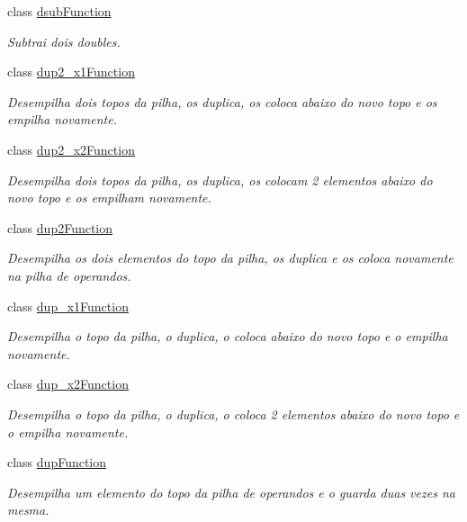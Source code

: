 \begin{DoxyCompactItemize}
class \hyperlink{classInstruction_1_1dsubFunction}{dsub\+Function}
\begin{DoxyCompactList}\small\item\em Subtrai dois doubles. \end{DoxyCompactList}\item 
class \hyperlink{classInstruction_1_1dup2__x1Function}{dup2\+\_\+x1\+Function}
\begin{DoxyCompactList}\small\item\em Desempilha dois topos da pilha, os duplica, os coloca abaixo do novo topo e os empilha novamente. \end{DoxyCompactList}\item 
class \hyperlink{classInstruction_1_1dup2__x2Function}{dup2\+\_\+x2\+Function}
\begin{DoxyCompactList}\small\item\em Desempilha dois topos da pilha, os duplica, os colocam 2 elementos abaixo do novo topo e os empilham novamente. \end{DoxyCompactList}\item 
class \hyperlink{classInstruction_1_1dup2Function}{dup2\+Function}
\begin{DoxyCompactList}\small\item\em Desempilha os dois elementos do topo da pilha, os duplica e os coloca novamente na pilha de operandos. \end{DoxyCompactList}\item 
class \hyperlink{classInstruction_1_1dup__x1Function}{dup\+\_\+x1\+Function}
\begin{DoxyCompactList}\small\item\em Desempilha o topo da pilha, o duplica, o coloca abaixo do novo topo e o empilha novamente. \end{DoxyCompactList}\item 
class \hyperlink{classInstruction_1_1dup__x2Function}{dup\+\_\+x2\+Function}
\begin{DoxyCompactList}\small\item\em Desempilha o topo da pilha, o duplica, o coloca 2 elementos abaixo do novo topo e o empilha novamente. \end{DoxyCompactList}\item 
class \hyperlink{classInstruction_1_1dupFunction}{dup\+Function}
\begin{DoxyCompactList}\small\item\em Desempilha um elemento do topo da pilha de operandos e o guarda duas vezes na mesma. \end{DoxyCompactList}\item 

\end{DoxyCompactItemize}
